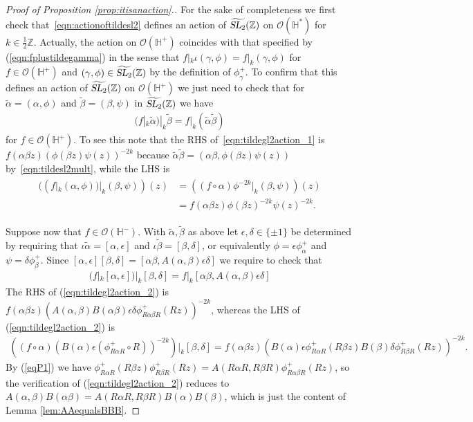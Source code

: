 \documentclass[aps,prd,groupedaddress,preprint,tightenlines,eqsecnum,nofootinbib]{revtex4}
\newcommand{\e}{\epsilon}
\newcommand{\SL}{\operatorname{\textsl{SL}}}      %
\newcommand{\Z}{{\mathbb Z}}%
\newcommand{\HH}{{\mathbb H}}%
\newcommand{\WT}{\widetilde}
\newcommand{\A}{\alpha}
\newcommand{\B}{\beta}
\newcommand{\OO}{\mathcal{O}}
\begin{document}
\begin{proof}[Proof of Proposition \ref{prop:itisanaction}.]
For the sake of completeness we first check that~\eqref{eqn:actionoftildesl2} defines an action of $\widetilde{\SL_2}(\Z)$ on $\OO(\HH^*)$ for $k\in \frac12\Z$. Actually, the action on $\mathcal{O}(\HH^+)$ coincides with that specified by (\ref{eqn:fplustildegamma}) in the sense that $f|_k\iota(\gamma,\phi)=f|_k(\gamma,\phi)$ for $f\in \mathcal{O}(\HH^+)$ and $(\gamma,\phi)\in \widetilde{\SL_2}(\Z)$ by the definition of $\phi_\gamma^+$. To confirm that this defines an action of $\widetilde{\SL_2}(\Z)$ on $\mathcal{O}(\HH^+)$ we just need to check that for $\WT\A=(\A,\phi)$ and $\WT\B=(\B,\psi)$ in $\widetilde{\SL_2}(\Z)$ we have
\begin{align}
\label{eqn:tildegl2action_1}
 (f|_k \WT \A)|_k \WT\B
= 
f|_k (\WT\A\WT\B) 
\end{align} 
for $f\in \OO(\HH^+)$. To see this note that the RHS of~\eqref{eqn:tildegl2action_1} is $f(\A\B z)(\phi(\B z)\psi(z))^{-2k}$ because $\WT\A\WT\B=(\A\B,\phi(\B z)\psi(z))$ by~\eqref{eqn:tildesl2mult}, while the LHS is 
\begin{align}
\begin{split}
	((f|_k(\A,\phi))|_k(\B,\psi))(z)
	&=((f\circ \A) \phi^{-2k} |_k(\B,\psi))(z)\\
	&=f(\A\B z)\phi(\B z)^{-2k}\psi(z)^{-2k}.
\end{split}
\end{align}

Suppose now that $f\in \mathcal{O}(\HH^-)$. With $\WT\A,\WT\B$ as above let $\e,\delta\in \{\pm 1\}$ be determined by requiring that $\iota\WT\A= [\A,\e]$ and $\iota\WT\B=[\B,\delta]$, or equivalently $\phi=\e\phi^+_\A$ and $\psi=\delta\phi^+_\B$. Since $[\A,\e][\B,\delta]=[\A\B,A(\A,\B)\e\delta]$ we require to check that 
\begin{align}
\label{eqn:tildegl2action_2}
 (f|_k [\A,\e])|_k [\B,\delta]
= 
f|_k [\A\B,A(\A,\B)\e\delta] 
\end{align} 
The RHS of (\ref{eqn:tildegl2action_2}) is $f(\A\B z) (A(\A,\B)B(\A\B)\e\delta \phi_{R\A\B R}^+(Rz))^{-2k}$, whereas the LHS of (\ref{eqn:tildegl2action_2}) is
\begin{gather}
	((f\circ \A)(B(\A)\e(\phi^+_{R\A R}\circ R))^{-2k})|_k[\B,\delta]
	=f(\A\B z)(B(\A)\e\phi^+_{R\A R}(R\B z)B(\B)\delta\phi^+_{R\B R}(R z))^{-2k}.
\end{gather}
By (\ref{eqP1}) we have $\phi^+_{R\A R}(R\B z)\phi^+_{R\B R}(R z) =A(R\A R,R\B R)\phi^+_{R\A\B R}(R z)$, so the verification of (\ref{eqn:tildegl2action_2}) reduces to $A(\A,\B)B(\A\B)=A(R\A R, R\B R)B(\A)B(\B)$, which is just the content of Lemma \ref{lem:AAequalsBBB}.


\end{proof}
\end{document}
